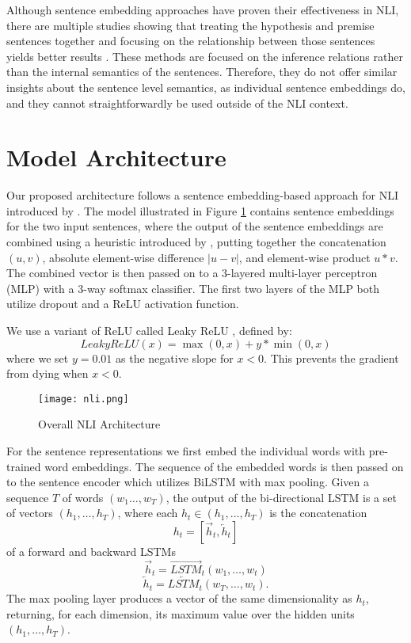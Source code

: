 \documentclass{nle}
\begin{document}
Although sentence embedding approaches have proven their effectiveness in NLI, there are multiple studies showing that treating the hypothesis and premise sentences together and focusing on the relationship between those sentences yields better results \citep{cafe,Chen}.
These methods are focused on the inference relations rather than the internal semantics of the sentences.
Therefore, they do not offer similar insights about the sentence level semantics, as individual sentence embeddings do, and they cannot  straightforwardly be used outside of the NLI context.


\section{Model Architecture}
\label{sec:architecture}

Our proposed architecture follows a sentence embedding-based approach for NLI introduced by \cite{snli}. The model illustrated in Figure \ref{fig:nli} contains sentence embeddings for the two input sentences, where the output of the sentence embeddings are combined using a heuristic introduced by \cite{MouConv}, putting together the concatenation $(u,v)$, absolute element-wise difference $|u-v|$, and element-wise product $u*v$. The combined vector is then passed on to a 3-layered multi-layer perceptron (MLP) with a 3-way softmax classifier. The first two layers of the MLP both utilize dropout and a ReLU activation function.

We use a variant of ReLU called Leaky ReLU \citep{Maas2013RectifierNI}, defined by:
$$LeakyReLU(x) = \max(0, x) + y * \min(0, x)$$
where we set $y = 0.01$ as the negative slope for $x < 0$.
This prevents the gradient from dying when $x < 0$.

\begin{figure}[h]
\begin{center}
  \texttt{[image: nli.png]}
\end{center}
  \caption{Overall NLI Architecture}
  \label{fig:nli}
\end{figure}

For the sentence representations we first embed the individual words with pre-trained word embeddings. The sequence of the embedded words is then passed on to the sentence encoder which utilizes BiLSTM with max pooling. Given a sequence $T$ of words $(w_1\ldots,w_T)$, the output of the bi-directional LSTM is
a set of vectors $(h_1,\ldots,h_T)$, where each $h_t\in(h_1,\ldots,h_T)$ is the concatenation
$$h_t = [\overrightarrow{h}_t,\overleftarrow{h}_t]$$
of a forward and backward LSTMs
$$\overrightarrow{h}_t = \overrightarrow{LSTM}_t(w_1,\ldots,w_t)$$
$$\overleftarrow{h}_t = \overleftarrow{LSTM}_t(w_T,\ldots,w_t).$$
The max pooling layer produces a vector of the same dimensionality as $h_t$, returning, for each dimension, its maximum value over
the hidden units $(h_1,\ldots,h_T)$.
\end{document}
